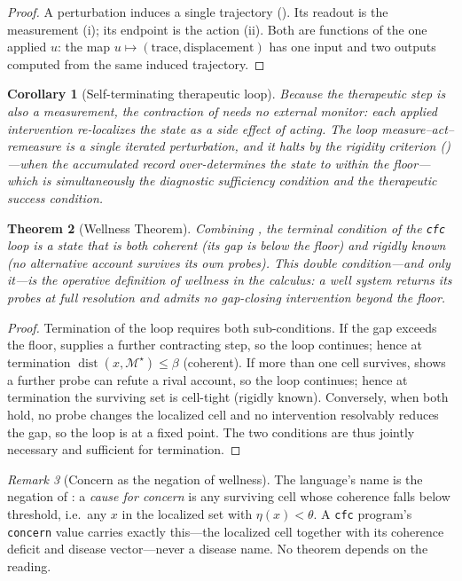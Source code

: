 \documentclass[11pt,a4paper]{article}
\theoremstyle{cfcthm}
\newtheorem{theorem}{Theorem}[section]
\newtheorem{corollary}[theorem]{Corollary}
\theoremstyle{definition}
\theoremstyle{remark}
\newtheorem{remark}[theorem]{Remark}
\newcommand{\Man}{\mathcal{M}}          %
\newcommand{\st}{x}                     %
\newcommand{\Coh}{\Man^{\star}}         %
\newcommand{\flo}{\beta}                %
\newcommand{\intv}{u}                   %
\newcommand{\ecoh}{\eta}                %
\newcommand{\dist}{\operatorname{dist}}
\newcommand{\cf}[1]{\texttt{#1}}
\begin{document}
\begin{proof}
A perturbation induces a single trajectory (). Its readout is
the measurement (i); its endpoint is the action (ii). Both are functions of the
one applied $\intv$: the map $\intv\mapsto(\text{trace},\text{displacement})$
has one input and two outputs computed from the same induced trajectory.
\end{proof}

\begin{corollary}[Self-terminating therapeutic loop]
\label{cor:loop}
Because the therapeutic step is also a measurement, the contraction of
 needs no external monitor: each applied intervention
re-localizes the state as a side effect of acting. The loop
measure--act--remeasure is a single iterated perturbation, and it halts by the
rigidity criterion ()---when the accumulated record
over-determines the state to within the floor---which is simultaneously the
diagnostic sufficiency condition and the therapeutic success condition.
\end{corollary}

\begin{theorem}[Wellness Theorem]
\label{thm:wellness}
Combining , the terminal condition of the
\cf{cfc} loop is a state that is both \emph{coherent} (its gap is below the
floor) and \emph{rigidly known} (no alternative account survives its own
probes). This double condition---and only it---is the operative definition of
wellness in the calculus: a well system returns its probes at full resolution
and admits no gap-closing intervention beyond the floor.
\end{theorem}

\begin{proof}
Termination of the loop requires both sub-conditions. If the gap exceeds the
floor,  supplies a further contracting step, so the loop
continues; hence at termination $\dist(\st,\Coh)\le\flo$ (coherent). If more
than one cell survives,  shows a further probe can refute a
rival account, so the loop continues; hence at termination the surviving set is
cell-tight (rigidly known). Conversely, when both hold, no probe changes the
localized cell and no intervention resolvably reduces the gap, so the loop is at
a fixed point. The two conditions are thus jointly necessary and sufficient for
termination.
\end{proof}

\begin{remark}[Concern as the negation of wellness]
\label{rem:concern}
The language's name is the negation of : a
\emph{cause for concern} is any surviving cell whose coherence falls below
threshold, i.e.\ any $\st$ in the localized set with $\ecoh(\st)<\theta$. A
\cf{cfc} program's \cf{concern} value carries exactly this---the localized
cell together with its coherence deficit and disease vector---never a disease
name. No theorem depends on the reading.
\end{remark}
\end{document}
